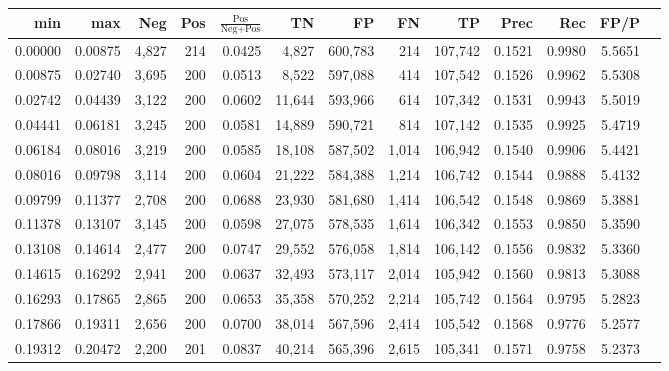 \begin{tabular}{rrrrrrrrrrrrr}
\toprule
    min &     max &   Neg & Pos & $\frac{\text{Pos}}{\text{Neg}+\text{Pos}}$ &      TN &      FP &      FN &      TP &   Prec &    Rec &   FP/P \\
\midrule
0.00000 & 0.00875 & 4,827 & 214 &                                     0.0425 &   4,827 & 600,783 &     214 & 107,742 & 0.1521 & 0.9980 & 5.5651 \\
0.00875 & 0.02740 & 3,695 & 200 &                                     0.0513 &   8,522 & 597,088 &     414 & 107,542 & 0.1526 & 0.9962 & 5.5308 \\
0.02742 & 0.04439 & 3,122 & 200 &                                     0.0602 &  11,644 & 593,966 &     614 & 107,342 & 0.1531 & 0.9943 & 5.5019 \\
0.04441 & 0.06181 & 3,245 & 200 &                                     0.0581 &  14,889 & 590,721 &     814 & 107,142 & 0.1535 & 0.9925 & 5.4719 \\
0.06184 & 0.08016 & 3,219 & 200 &                                     0.0585 &  18,108 & 587,502 &   1,014 & 106,942 & 0.1540 & 0.9906 & 5.4421 \\
0.08016 & 0.09798 & 3,114 & 200 &                                     0.0604 &  21,222 & 584,388 &   1,214 & 106,742 & 0.1544 & 0.9888 & 5.4132 \\
0.09799 & 0.11377 & 2,708 & 200 &                                     0.0688 &  23,930 & 581,680 &   1,414 & 106,542 & 0.1548 & 0.9869 & 5.3881 \\
0.11378 & 0.13107 & 3,145 & 200 &                                     0.0598 &  27,075 & 578,535 &   1,614 & 106,342 & 0.1553 & 0.9850 & 5.3590 \\
0.13108 & 0.14614 & 2,477 & 200 &                                     0.0747 &  29,552 & 576,058 &   1,814 & 106,142 & 0.1556 & 0.9832 & 5.3360 \\
0.14615 & 0.16292 & 2,941 & 200 &                                     0.0637 &  32,493 & 573,117 &   2,014 & 105,942 & 0.1560 & 0.9813 & 5.3088 \\
0.16293 & 0.17865 & 2,865 & 200 &                                     0.0653 &  35,358 & 570,252 &   2,214 & 105,742 & 0.1564 & 0.9795 & 5.2823 \\
0.17866 & 0.19311 & 2,656 & 200 &                                     0.0700 &  38,014 & 567,596 &   2,414 & 105,542 & 0.1568 & 0.9776 & 5.2577 \\
0.19312 & 0.20472 & 2,200 & 201 &                                     0.0837 &  40,214 & 565,396 &   2,615 & 105,341 & 0.1571 & 0.9758 & 5.2373 \\

\end{tabular}
